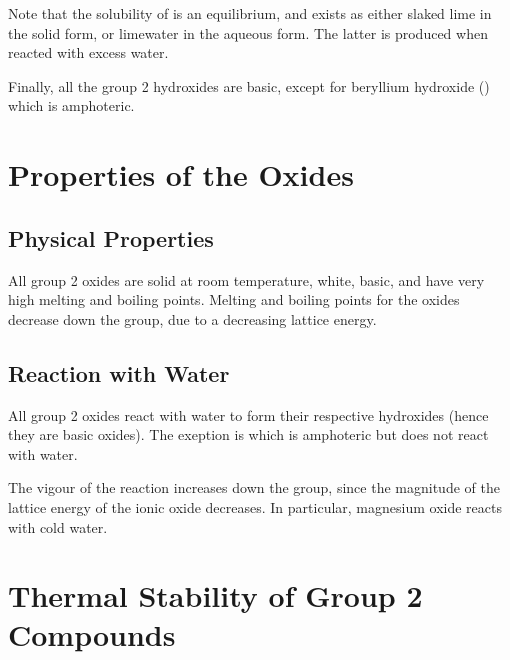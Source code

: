 
			Note that the solubility of  is an equilibrium, and exists as either slaked lime in
			the solid form, or limewater in the aqueous form. The latter is produced when reacted with excess
			water.

			Finally, all the group 2 hydroxides are basic, except for beryllium hydroxide () which is amphoteric.



	\section{Properties of the Oxides}

		\subsection{Physical Properties}

			All group 2 oxides are solid at room temperature, white, basic, and have very high melting
			and boiling points. Melting and boiling points for the oxides decrease down the group, due to a decreasing lattice energy.



		\subsection{Reaction with Water}

			All group 2 oxides react with water to form their respective hydroxides (hence they are basic
			oxides). The exeption is  which is amphoteric but does not react with water.

			The vigour of the reaction increases down the group, since the magnitude of the lattice energy
			of the ionic oxide decreases. In particular, magnesium oxide reacts  with cold water.





	\pagebreak
	\section{Thermal Stability of Group 2 Compounds}

